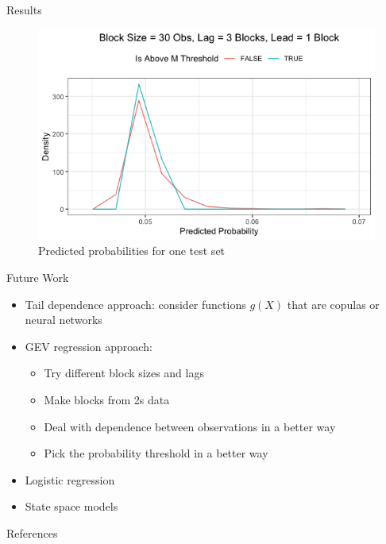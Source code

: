 \documentclass{beamer}
\begin{document}
\begin{frame}{Results}
    \begin{figure}
        \centering
        \includegraphics[scale=0.5]{pred_prob_freq_polys.png}
        \caption{Predicted probabilities for one test set}
        \label{fig:pred_prob_freq_polys}
    \end{figure}
\end{frame}

\begin{frame}{Future Work}
    \begin{itemize}
        \item Tail dependence approach: consider functions $g(X)$ that are copulas or neural networks
        \item GEV regression approach:
        \begin{itemize}
            \item Try different block sizes and lags
            \item Make blocks from 2s data
            \item Deal with dependence between observations in a better way
            \item Pick the probability threshold in a better way
        \end{itemize}
        \item Logistic regression
        \item State space models
    \end{itemize}
\end{frame}

\begin{frame}{References}
    \nocite{*}
    \printbibliography
\end{frame}
\end{document}

